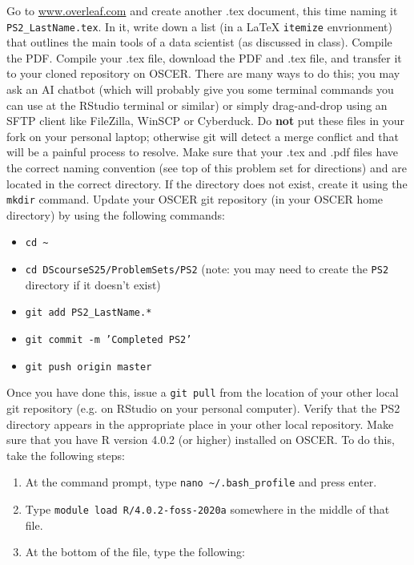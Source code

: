 \documentclass[12pt,english]{exam}
\begin{document}
\begin{questions}
\begin{enumerate}
\end{enumerate}
\question Go to \url{www.overleaf.com} and create another .tex document, this time naming it \texttt{PS2\_LastName.tex}. In it, write down a list (in a LaTeX \texttt{itemize} envrionment) that outlines the main tools of a data scientist (as discussed in class). Compile the PDF.
\question Compile your .tex file, download the PDF and .tex file, and transfer it to your cloned repository on OSCER. There are many ways to do this;  you may ask an AI chatbot (which will probably give you some terminal commands you can use at the RStudio terminal or similar) or simply drag-and-drop using an SFTP client like FileZilla, WinSCP or Cyberduck. Do \textbf{not} put these files in your fork on your personal laptop; otherwise git will detect a merge conflict and that will be a painful process to resolve.
\question Make sure that your .tex and .pdf files have the correct naming convention (see top of this problem set for directions) and are located in the correct directory. If the directory does not exist, create it using the \texttt{mkdir} command.
\question Update your OSCER git repository (in your OSCER home directory) by using the following commands:
\begin{itemize}
    \item \texttt{cd \~}
    \item \texttt{cd DScourseS25/ProblemSets/PS2} (note: you may need to create the \texttt{PS2} directory if it doesn't exist)
    \item \texttt{git add PS2\_LastName.*}
    \item \texttt{git commit -m 'Completed PS2'}
    \item \texttt{git push origin master}
\end{itemize}
Once you have done this, issue a \texttt{git pull} from the location of your other local git repository (e.g. on RStudio on your personal computer). Verify that the PS2 directory appears in the appropriate place in your other local repository.
\question Make sure that you have R version 4.0.2 (or higher) installed on OSCER. To do this, take the following steps:
\begin{enumerate}
    \item At the command prompt, type \texttt{nano \textasciitilde/.bash\_profile} and press enter. 
    \item Type \texttt{module load R/4.0.2-foss-2020a} somewhere in the middle of that file. 
    \item At the bottom of the file, type the following:

\end{enumerate}
\end{questions}
\end{document}
